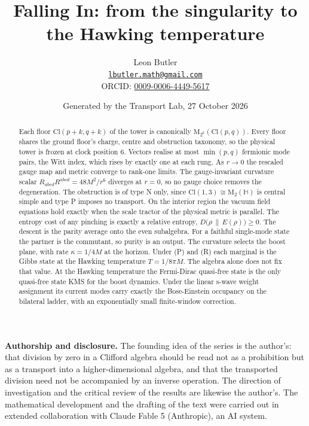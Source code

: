 \documentclass[11pt]{article}
\title{\bfseries Falling In: from the singularity to the Hawking temperature}
\author{Leon Butler\\ \normalsize\href{mailto:lbutler.math@gmail.com}{\texttt{lbutler.math@gmail.com}}\\ \normalsize ORCID: \href{https://orcid.org/0009-0006-4449-5617}{0009-0006-4449-5617}}
\date{Generated by the Transport Lab, 27 October 2026}
\theoremstyle{definition}
\theoremstyle{plain}
\providecommand{\Cl}{}\renewcommand{\Cl}{\mathrm{Cl}}
\providecommand{\HH}{}\renewcommand{\HH}{\mathbb{H}}
\providecommand{\Mat}{}\renewcommand{\Mat}{\mathrm{M}}
\providecommand{\rel}{}\renewcommand{\rel}[2]{D\bigl(#1 \,\|\, #2\bigr)}
\begin{document}
\maketitle
\begin{abstract}
\normalsize
Each floor $\Cl(p{+}k, q{+}k)$ of the tower is canonically $\Mat_{2^k}(\Cl(p,q))$. Every floor shares the ground floor's charge, centre and obstruction taxonomy, so the physical tower is frozen at clock position $6$. Vectors realise at most $\min(p,q)$ fermionic mode pairs, the Witt index, which rises by exactly one at each rung. As $r \to 0$ the rescaled gauge map and metric converge to rank-one limits. The gauge-invariant curvature scalar $R_{abcd}R^{abcd} = 48M^2/r^6$ diverges at $r = 0$, so no gauge choice removes the degeneration. The obstruction is of type N only, since $\Cl(1,3) \cong \Mat_2(\HH)$ is central simple and type P imposes no transport. On the interior region the vacuum field equations hold exactly when the scale tractor of the physical metric is parallel. The entropy cost of any pinching is exactly a relative entropy, $\rel{\rho}{E(\rho)} \geq 0$. The descent is the parity average onto the even subalgebra. For a faithful single-mode state the partner is the commutant, so purity is an output. The curvature selects the boost plane, with rate $\kappa = 1/4M$ at the horizon. Under (P) and (R) each marginal is the Gibbs state at the Hawking temperature $T = 1/8\pi M$. The algebra alone does not fix that value. At the Hawking temperature the Fermi-Dirac quasi-free state is the only quasi-free state KMS for the boost dynamics. Under the linear s-wave weight assignment its current modes carry exactly the Bose-Einstein occupancy on the bilateral ladder, with an exponentially small finite-window correction.
\end{abstract}
\newpage
\noindent \textbf{Authorship and disclosure. }The founding idea of the series is the author's: that division by zero in a Clifford algebra should be read not as a prohibition but as a transport into a higher-dimensional algebra, and that the transported division need not be accompanied by an inverse operation. The direction of investigation and the critical review of the results are likewise the author's. The mathematical development and the drafting of the text were carried out in extended collaboration with Claude Fable 5 (Anthropic), an AI system.

\noindent{}
\newpage
\end{document}
